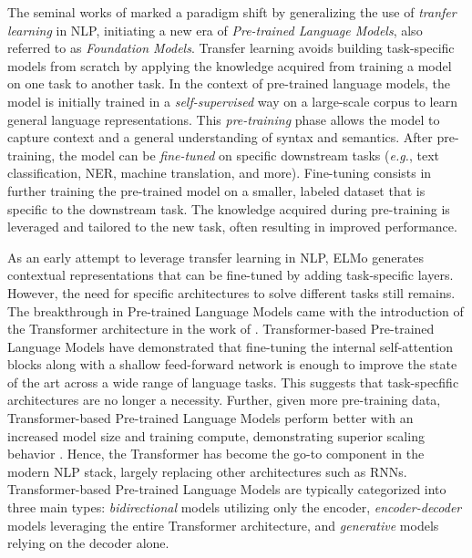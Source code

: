 The seminal works of \citet{peters-etal-2018-deep, devlin2018bert, radford2018improving} marked a paradigm shift by generalizing the use of \textit{tranfer learning} in \ac{NLP}, initiating a new era of \textit{Pre-trained Language Models}, also referred to as \textit{Foundation Models}. Transfer learning avoids building task-specific models from scratch by applying the knowledge acquired from training a model on one task to another task. In the context of pre-trained language models, the model is initially trained in a \textit{self-supervised} way on a large-scale corpus to learn general language representations. This \textit{pre-training} phase allows the model to capture context and a general understanding of syntax and semantics. After pre-training, the model can be \textit{fine-tuned} on specific downstream tasks (\textit{e.g.}, text classification, \ac{NER}, machine translation, and more). Fine-tuning consists in further training the pre-trained model on a smaller, labeled dataset that is specific to the downstream task. The knowledge acquired during pre-training is leveraged and tailored to the new task, often resulting in improved performance.


As an early attempt to leverage transfer learning in \ac{NLP}, \ac{ELMo} generates contextual representations that can be fine-tuned by adding task-specific layers. However, the need for specific architectures to solve different tasks still remains. The breakthrough in Pre-trained Language Models came with the introduction of the Transformer architecture in the work of \citet{vaswani2017attention}. Transformer-based Pre-trained Language Models \citep{devlin2018bert, radford2018improving} have demonstrated that fine-tuning the internal self-attention blocks along with a shallow feed-forward network is enough to improve the state of the art across a wide range of language tasks. This suggests that task-specfific architectures are no longer a necessity. Further, given more pre-training data, Transformer-based Pre-trained Language Models perform better with an increased model size and training compute, demonstrating superior scaling behavior \citep{kaplan2020scaling}. Hence, the Transformer has become the go-to component in the modern \ac{NLP} stack, largely replacing other architectures such as \acp{RNN}. Transformer-based Pre-trained Language Models are typically categorized into three main types: \textit{bidirectional} models utilizing only the encoder, \textit{encoder-decoder} models leveraging the entire Transformer architecture, and \textit{generative} models relying on the decoder alone.

